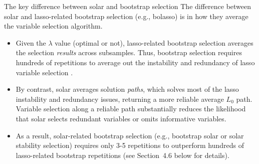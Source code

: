 \documentclass{beamer}
\begin{document}
\begin{frame}{The key difference between solar and bootstrap selection}
  The difference between solar and lasso-related bootstrap selection (e.g., bolasso) is in how they average the variable selection algorithm.
  \begin{itemize}
    \item  Given the $\lambda$ value (optimal or not), lasso-related bootstrap selection averages the selection \emph{results} across subsamples. Thus, bootstrap selection requires hundreds of repetitions to average out the instability and redundancy of lasso variable selection \citep{bach2008bolasso}. 
    
    \item By contrast, solar averages solution \emph{paths}, which solves most of the lasso instability and redundancy issues, returning a more reliable average $L_0$ path. Variable selection along a reliable path substantially reduces the likelihood that solar selects redundant variables or omits informative variables. 
    
   \item As a result, solar-related bootstrap selection (e.g., bootstrap solar or solar stability selection) requires only 3-5 repetitions to outperform hundreds of lasso-related bootstrap repetitions (see Section~4.6 below for details).
  \end{itemize}
\end{frame}
\end{document}
